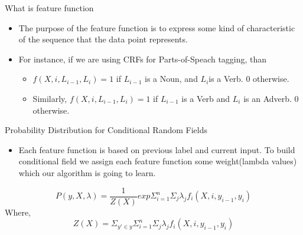 \documentclass[10pt]{beamer}
\theoremstyle{remark}
\theoremstyle{definition}
\begin{document}
\begin{frame}{What is feature function}
\begin{itemize}
    \item The purpose of the feature function is to express some kind of characteristic of the sequence that the data point represents. 
    \item For instance, if we are using CRFs for Parts-of-Speach tagging, than
    \begin{itemize}
        \item \(f(X, i, L_{i - 1}, L_{i} ) = 1\) if \(L_{i - 1}\) is a Noun, and \(L_{i}\)is a Verb. 0 otherwise.
        \item Similarly, \(f(X, i, L_{i - 1}, L_{i} ) = 1\) if \(L_{i - 1}\) is a Verb and \(L_{i}\) is an Adverb. 0 otherwise.
    \end{itemize}
\end{itemize}
\end{frame}

\begin{frame}{Probability Distribution for Conditional Random Fields}
\begin{itemize}
    \item Each feature function is based on previous label and current input. To build conditional field we assign each feature function some weight(lambda values) which our algorithm is going to learn.
\end{itemize}
\begin{equation}
    P(y,X,\lambda) = \frac{1}{Z(X)}exp{\Sigma_{i=1}^n\Sigma_j\lambda_jf_i(X,i,y_{i-1},y_i)}
\end{equation}
Where,
\begin{equation}
    Z(X) = \Sigma_{y'\in y} \Sigma_{i=1}^n\Sigma_j\lambda_jf_i(X,i,y_{i-1},y_i)
\end{equation}
\end{frame}
\end{document}
